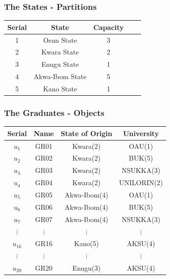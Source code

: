 \documentclass[10pt]{beamer}
\begin{document}
			\begin{frame}
				\frametitle{The States - Partitions}
				\begin{center}
					\begin{tabular}{|c|c|c|c|c|}
						\hline
						\textbf{Serial} & \textbf{State} & \textbf{Capacity} \\
						\hline
						1 & Osun State & 3\\
						\hline
						2 & Kwara State & 2\\
						\hline
						3 & Enugu State & 1\\
						\hline
						4 & Akwa-Ibom State & 5\\
						\hline
						5 & Kano State & 1\\
						\hline
					\end{tabular}		
				\end{center}
			\end{frame}
			\begin{frame}
				\frametitle{The Graduates - Objects}
				
				\begin{center}
					\begin{tabular}{|c|c|c|c|}
						\hline
						\textbf{Serial} & \textbf{Name} & \textbf{State of Origin} & \textbf{University}\\
						\hline
						$u_{1}$ & GR01 & Kwara(2) & OAU(1)\\
						\hline
						$u_{2}$ & GR02 & Kwara(2) & BUK(5)\\
						\hline
						$u_{3}$ & GR03 & Kwara(2) & NSUKKA(3)\\
						\hline
						$u_{4}$ & GR04 & Kwara(2) & UNILORIN(2)\\
						\hline
						$u_{5}$ & GR05 & Akwa-Ibom(4) & OAU(1)\\
						\hline
						$u_{6}$ & GR06 & Akwa-Ibom(4) & BUK(5)\\
						\hline
						$u_{7}$ & GR07 & Akwa-Ibom(4) & NSUKKA(3)\\
						\hline
						$\vdots $ & $\vdots $ & $\vdots $ & $\vdots $ \\
						\hline
						$u_{16}$ & GR16 & Kano(5) & AKSU(4)\\
						\hline
						$\vdots $ & $\vdots $ & $\vdots $ & $\vdots $ \\
						\hline
						$u_{20}$ & GR20 & Enugu(3) & AKSU(4)\\
						\hline
					\end{tabular}		
				\end{center}
			\end{frame}
\end{document}
